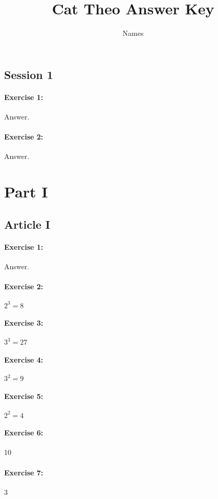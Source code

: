 \documentclass{article}
\title{Cat Theo Answer Key}
\author{Names}
\begin{document}
\maketitle
{}
\newpage
\tableofcontents
{}
\newpage

\subsection*{Session 1}
\paragraph{Exercise 1:}
Answer.
\paragraph{Exercise 2:}
Answer.
\newpage

\section*{Part I}

\subsection*{Article I}
\paragraph{Exercise 1:}
Answer.
\paragraph{Exercise 2:}
$2^3=8$
\paragraph{Exercise 3:}
$3^3=27$
\paragraph{Exercise 4:}
$3^2=9$
\paragraph{Exercise 5:}
$2^2=4$
\paragraph{Exercise 6:}
10
\paragraph{Exercise 7:}
3
\end{document}
